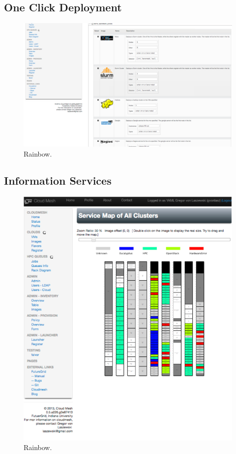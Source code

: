 \subsection{One Click Deployment}
\begin{figure}[h!]
  \centering
    \includegraphics[width=1.0\textwidth]{images/oneclick.pdf}
  \caption{Rainbow.}
\end{figure}

\subsection{Information Services}

\begin{figure}[h!]
  \centering
    \includegraphics[width=1.0\textwidth]{images/rainbow.pdf}
  \caption{Rainbow.}
\end{figure}
